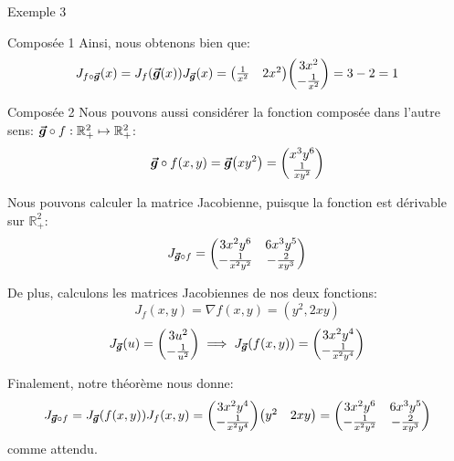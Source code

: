 \documentclass[a4paper]{article}
\begin{document}
\begin{parag}{Exemple 3}
\begin{subparag}{Composée 1}
        Ainsi, nous obtenons bien que:
        \[J_{f \circ \bvec{g}}\left(x\right) = J_f\left(\bvec{g}\left(x\right)\right) J_{\bvec{g}}\left(x\right) = \begin{pmatrix} \frac{1}{x^2} & 2x^2 \end{pmatrix} \begin{pmatrix} 3x^2 \\ -\frac{1}{x^2} \end{pmatrix} = 3 - 2 = 1\]
    \end{subparag}


    \begin{subparag}{Composée 2}
        Nous pouvons aussi considérer la fonction composée dans l'autre sens: $\bm{\protect\vec{g}} \circ f : \mathbb{R}_+^2  \mapsto \mathbb{R}_+^2$:
        \[\bvec{g}\circ f\left(x, y\right) = \bvec{g}\left(xy^2\right) = \begin{pmatrix} x^3 y^6 \\ \frac{1}{x y^2} \end{pmatrix} \]

        Nous pouvons calculer la matrice Jacobienne, puisque la fonction est dérivable sur $\mathbb{R}_+^2$:
        \[J_{\bm{\protect\vec{g}} \circ f} = \begin{pmatrix} 3x^2 y^6 & 6x^3 y^5 \\ - \frac{1}{x^2 y^2} & -\frac{2}{xy^3} \end{pmatrix} \]

        De plus, calculons les matrices Jacobiennes de nos deux fonctions:
        \[J_f\left(x, y\right) = \nabla f\left(x, y\right) = \left(y^2, 2xy\right)\]
        \[J_{\bvec{g}}\left(u\right) = \begin{pmatrix} 3u^2 \\ -\frac{1}{u^2} \end{pmatrix} \implies J_{\bvec{g}}\left(f\left(x, y\right)\right) = \begin{pmatrix} 3x^2 y^4 \\ -\frac{1}{x^2 y^4} \end{pmatrix} \]

        Finalement, notre théorème nous donne:
        \[J_{\bvec{g}\circ f} = J_{\bvec{g}}\left(f\left(x, y\right)\right) J_f\left(x, y\right) = \begin{pmatrix} 3x^2 y^4 \\ -\frac{1}{x^2 y^4} \end{pmatrix} \begin{pmatrix} y^2 & 2xy \end{pmatrix}  = \begin{pmatrix} 3x^2 y^6 & 6x^3 y^5 \\ -\frac{1}{x^2 y^2} & - \frac{2}{xy^3} \end{pmatrix} \]
        comme attendu.


\end{subparag}
\end{parag}
\end{document}
